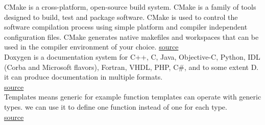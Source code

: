 \documentclass[a4paper,11pt]{report}
\begin{document}
CMake is a cross-platform, open-source build system. CMake is a family of tools designed to build, test and package software. CMake is used to control the software compilation process using simple platform and compiler independent configuration files. CMake generates native makefiles and workspaces that can be used in the compiler environment of your choice.
\href{http://www.cmake.org/}{source} \\


Doxygen is a documentation system for C++, C, Java, Objective-C, Python, IDL (Corba and Microsoft flavors), Fortran, VHDL, PHP, C\#, and to some extent D. 
it can produce documentation in multiple formats. \\
\href{http://www.stack.nl/~dimitri/doxygen/}{source}  \\


Templates means generic for example function templates can operate with generic types. we can use it to define one function instead of one for each type. \\
\href{http://www.cplusplus.com/doc/tutorial/templates/}{source} \\





\printbibliography
\end{document}

